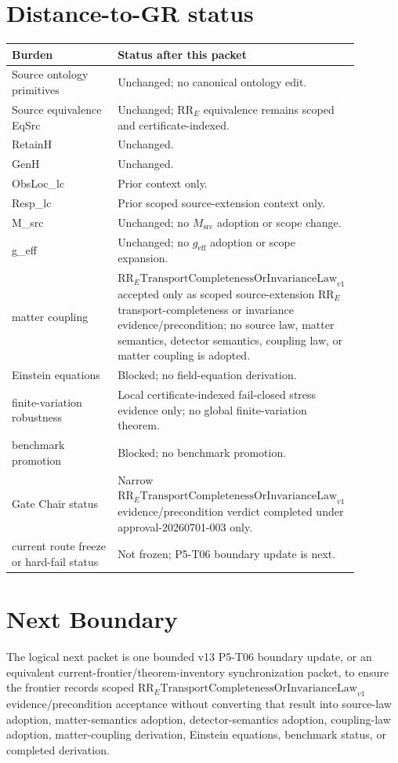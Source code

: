 \documentclass[11pt]{article}
\newcommand{\RRE}{\mathrm{RR}_{E}}
\newcommand{\LawRR}{\mathrm{RR}_{E}\mathrm{TransportCompletenessOrInvarianceLaw}_{v1}}
\newcommand{\geff}{g_{\mathrm{eff}}}
\begin{document}
\section{Distance-to-GR status}

\begin{longtable}{p{0.30\linewidth}p{0.58\linewidth}}
\toprule
Burden & Status after this packet \\
\midrule
Source ontology primitives & Unchanged; no canonical ontology edit. \\
Source equivalence EqSrc & Unchanged; \(\RRE\) equivalence remains scoped and certificate-indexed. \\
RetainH & Unchanged. \\
GenH & Unchanged. \\
ObsLoc\_lc & Prior context only. \\
Resp\_lc & Prior scoped source-extension context only. \\
M\_src & Unchanged; no \(M_{\mathrm{src}}\) adoption or scope change. \\
g\_eff & Unchanged; no \(\geff\) adoption or scope expansion. \\
matter coupling & \(\LawRR\) accepted only as scoped source-extension \(\RRE\) transport-completeness or invariance evidence/precondition; no source law, matter semantics, detector semantics, coupling law, or matter coupling is adopted. \\
Einstein equations & Blocked; no field-equation derivation. \\
finite-variation robustness & Local certificate-indexed fail-closed stress evidence only; no global finite-variation theorem. \\
benchmark promotion & Blocked; no benchmark promotion. \\
Gate Chair status & Narrow \(\LawRR\) evidence/precondition verdict completed under approval-20260701-003 only. \\
current route freeze or hard-fail status & Not frozen; P5-T06 boundary update is next. \\
\bottomrule
\end{longtable}

\section{Next Boundary}

The logical next packet is one bounded v13 P5-T06 boundary update, or an
equivalent current-frontier/theorem-inventory synchronization packet, to ensure
the frontier records scoped \(\LawRR\) evidence/precondition acceptance without
converting that result into source-law adoption, matter-semantics adoption,
detector-semantics adoption, coupling-law adoption, matter-coupling derivation,
Einstein equations, benchmark status, or completed derivation.
\end{document}
